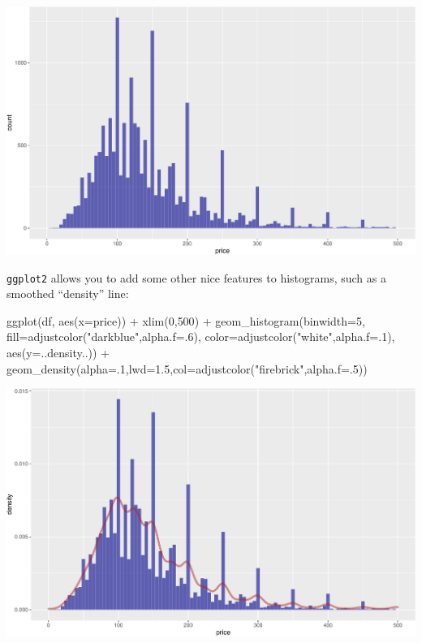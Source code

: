 \documentclass[
]{book}
\newenvironment{Shaded}{\begin{snugshade}}{\end{snugshade}}
\newcommand{\AttributeTok}[1]{\textcolor[rgb]{0.77,0.63,0.00}{#1}}
\newcommand{\DecValTok}[1]{\textcolor[rgb]{0.00,0.00,0.81}{#1}}
\newcommand{\FloatTok}[1]{\textcolor[rgb]{0.00,0.00,0.81}{#1}}
\newcommand{\FunctionTok}[1]{\textcolor[rgb]{0.00,0.00,0.00}{#1}}
\newcommand{\NormalTok}[1]{#1}
\newcommand{\SpecialCharTok}[1]{\textcolor[rgb]{0.00,0.00,0.00}{#1}}
\newcommand{\StringTok}[1]{\textcolor[rgb]{0.31,0.60,0.02}{#1}}
\begin{document}
\includegraphics{figures/unnamed-chunk-217-1.pdf}

\texttt{ggplot2} allows you to add some other nice features to histograms, such as a smoothed ``density'' line:

\begin{Shaded}
\begin{Highlighting}[]
\FunctionTok{ggplot}\NormalTok{(df, }\FunctionTok{aes}\NormalTok{(}\AttributeTok{x=}\NormalTok{price)) }\SpecialCharTok{+} 
  \FunctionTok{xlim}\NormalTok{(}\DecValTok{0}\NormalTok{,}\DecValTok{500}\NormalTok{) }\SpecialCharTok{+}
  \FunctionTok{geom\_histogram}\NormalTok{(}\AttributeTok{binwidth=}\DecValTok{5}\NormalTok{,}
                 \AttributeTok{fill=}\FunctionTok{adjustcolor}\NormalTok{(}\StringTok{"darkblue"}\NormalTok{,}\AttributeTok{alpha.f=}\NormalTok{.}\DecValTok{6}\NormalTok{),}
                 \AttributeTok{color=}\FunctionTok{adjustcolor}\NormalTok{(}\StringTok{"white"}\NormalTok{,}\AttributeTok{alpha.f=}\NormalTok{.}\DecValTok{1}\NormalTok{),}
                 \FunctionTok{aes}\NormalTok{(}\AttributeTok{y=}\NormalTok{..density..)) }\SpecialCharTok{+}
  \FunctionTok{geom\_density}\NormalTok{(}\AttributeTok{alpha=}\NormalTok{.}\DecValTok{1}\NormalTok{,}\AttributeTok{lwd=}\FloatTok{1.5}\NormalTok{,}\AttributeTok{col=}\FunctionTok{adjustcolor}\NormalTok{(}\StringTok{"firebrick"}\NormalTok{,}\AttributeTok{alpha.f=}\NormalTok{.}\DecValTok{5}\NormalTok{))}
\end{Highlighting}
\end{Shaded}

\includegraphics{figures/unnamed-chunk-218-1.pdf}
\end{document}
